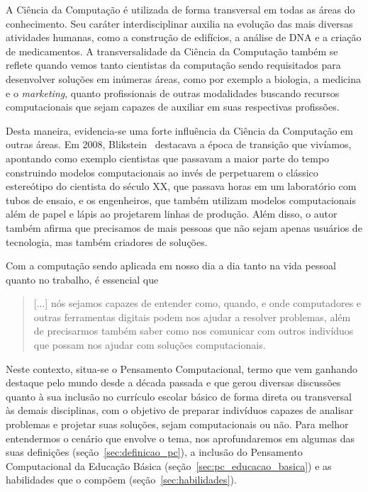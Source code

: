 A Ciência da Computação é utilizada de forma transversal em todas as áreas do conhecimento. Seu caráter interdisciplinar auxilia na evolução das mais diversas atividades humanas, como a construção de edifícios, a análise de DNA e a criação de medicamentos.  A transversalidade da Ciência da Computação também se reflete quando vemos tanto cientistas da computação sendo requisitados para desenvolver soluções em inúmeras áreas, como por exemplo a biologia, a medicina e o \textit{marketing}, quanto profissionais de outras modalidades buscando recursos computacionais que sejam capazes de auxiliar em suas respectivas profissões.

Desta maneira, evidencia-se uma forte influência da Ciência da Computação em outras áreas. Em 2008, Blikstein~\cite{blikstein_o_2008} destacava a época de transição que vivíamos, apontando como exemplo cientistas que passavam a maior parte do tempo construindo modelos computacionais ao invés de perpetuarem o clássico estereótipo do cientista do século XX, que passava horas em um laboratório com tubos de ensaio, e os engenheiros, que também utilizam modelos computacionais além de papel e lápis ao projetarem linhas de produção. Além disso, o autor também afirma que precisamos de mais pessoas que não sejam apenas usuários de tecnologia, mas também criadores de soluções.

Com a computação sendo aplicada em nosso dia a dia tanto na vida pessoal quanto no trabalho, é essencial que 
\begin{quote}
[...] nós sejamos capazes de entender como, quando, e onde computadores e outras ferramentas digitais podem nos ajudar a resolver problemas, além de precisarmos também saber como nos comunicar com outros indivíduos que possam nos ajudar com soluções computacionais.~\cite[~p.23, tradução das autoras]{barr_computational_2011}
\end{quote}

Neste contexto, situa-se o Pensamento Computacional, termo que vem ganhando destaque pelo mundo desde a década passada e que gerou diversas discussões quanto à sua inclusão no currículo escolar básico de forma direta ou transversal às demais disciplinas, com o objetivo de preparar indivíduos capazes de analisar problemas e projetar suas soluções, sejam computacionais ou não. Para melhor entendermos o cenário que envolve o tema, nos aprofundaremos em algumas das suas definições (seção~\ref{sec:definicao_pc}), a inclusão do Pensamento Computacional da Educação Básica (seção~\ref{sec:pc_educacao_basica}) e as habilidades que o compõem (seção~\ref{sec:habilidades}).

